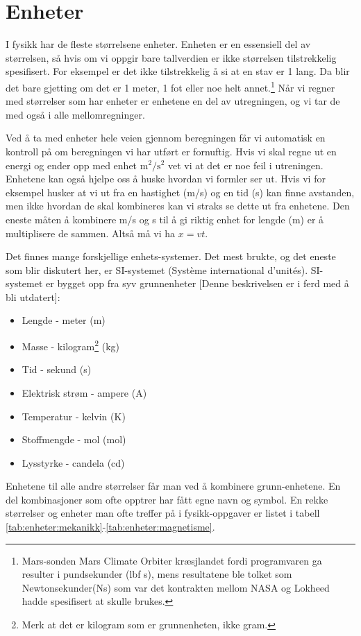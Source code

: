 \chapter{Enheter}
I fysikk har de fleste størrelsene enheter. Enheten er en essensiell del av størrelsen, så hvis om vi oppgir bare tallverdien er ikke størrelsen tilstrekkelig spesifisert. For eksempel er det ikke tilstrekkelig å si at en stav er 1 lang. Da blir det bare gjetting om det er 1 meter, 1 fot eller noe helt annet.\footnote{Mars-sonden Mars Climate Orbiter kræsjlandet fordi programvaren ga resulter i pundsekunder (lbf s), mens resultatene ble tolket som Newtonsekunder(Ns) som var det kontrakten mellom NASA og Lokheed hadde spesifisert at skulle brukes.} Når vi regner med størrelser som har enheter er enhetene en del av utregningen, og vi tar de med også i alle mellomregninger.

Ved å ta med enheter hele veien gjennom beregningen får vi automatisk en kontroll på om beregningen vi har utført er fornuftig. Hvis vi skal regne ut en energi og ender opp med enhet $\mathrm{m^2/s^2}$ vet vi at det er noe feil i utreningen. Enhetene kan også hjelpe oss å huske hvordan vi formler ser ut. Hvis vi for eksempel husker at vi ut fra en hastighet (m/s) og en tid (s) kan finne avstanden, men ikke hvordan de skal kombineres kan vi straks se dette ut fra enhetene. Den eneste måten å kombinere m/s og s til å gi riktig enhet for lengde (m) er å multiplisere de sammen. Altså må vi ha $x = vt$.

Det finnes mange forskjellige enhets-systemer. Det mest brukte, og det eneste som blir diskutert her, er SI-systemet (Système international d'unités). SI-systemet er bygget opp fra syv grunnenheter {\color{red}[Denne beskrivelsen er i ferd med å bli utdatert]}:
\begin{itemize}
\item Lengde - meter (m)
\item Masse - kilogram\footnote{Merk at det er kilogram som er grunnenheten, ikke gram.} (kg)
\item Tid - sekund (s)
\item Elektrisk strøm - ampere (A)
\item Temperatur - kelvin (K)
\item Stoffmengde - mol (mol)
\item Lysstyrke - candela (cd)
\end{itemize}
Enhetene til alle andre størrelser får man ved å kombinere grunn-enhetene. En del kombinasjoner som ofte opptrer har fått egne navn og symbol. En rekke størrelser og enheter man ofte treffer på i fysikk-oppgaver er listet i tabell \ref{tab:enheter:mekanikk}-\ref{tab:enheter:magnetisme}.

